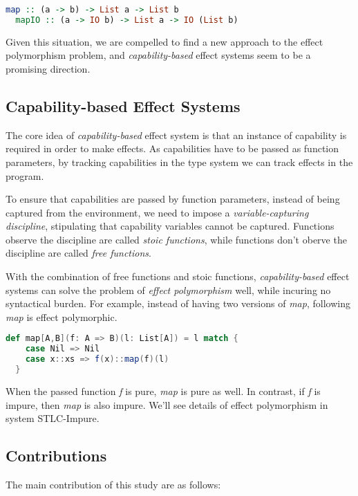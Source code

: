 \begin{lstlisting}[language=Haskell]
  map :: (a -> b) -> List a -> List b
  mapIO :: (a -> IO b) -> List a -> IO (List b)
\end{lstlisting}

Given this situation, we are compelled to find a new approach to the
effect polymorphism problem, and \emph{capability-based} effect
systems seem to be a promising direction.

\subsection{Capability-based Effect Systems}

The core idea of \emph{capability-based} effect system is that an
instance of capability is required in order to make effects. As
capabilities have to be passed as function parameters, by tracking
capabilities in the type system we can track effects in the program.

To ensure that capabilities are passed by function parameters, instead
of being captured from the environment, we need to impose a
\emph{variable-capturing discipline}, stipulating that capability
variables cannot be captured. Functions observe the discipline are
called \emph{stoic functions}, while functions don't oberve the
discipline are called \emph{free functions}.

With the combination of free functions and stoic functions,
\emph{capability-based} effect systems can solve the problem of
\emph{effect polymorphism} well, while incuring no syntactical
burden. For example, instead of having two versions of \emph{map},
following \emph{map} is effect polymorphic.

\begin{lstlisting}[language=Scala]
  def map[A,B](f: A => B)(l: List[A]) = l match {
    case Nil => Nil
    case x::xs => f(x)::map(f)(l)
  }
\end{lstlisting}

When the passed function \emph{f} is pure, \emph{map} is pure as
well. In contrast, if \emph{f} is impure, then \emph{map} is also
impure. We'll see details of effect polymorphism in system
STLC-Impure.

\subsection{Contributions}

The main contribution of this study are as follows:

